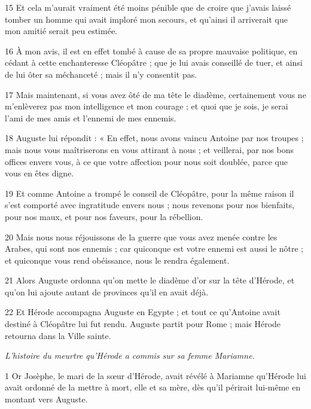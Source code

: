 \par 15 Et cela m'aurait vraiment été moins pénible que de croire que j'avais laissé tomber un homme qui avait imploré mon secours, et qu'ainsi il arriverait que mon amitié serait peu estimée.

\par 16 À mon avis, il est en effet tombé à cause de sa propre mauvaise politique, en cédant à cette enchanteresse Cléopâtre ; que je lui avais conseillé de tuer, et ainsi de lui ôter sa méchanceté ; mais il n'y consentit pas.

\par 17 Mais maintenant, si vous avez ôté de ma tête le diadème, certainement vous ne m'enlèverez pas mon intelligence et mon courage ; et quoi que je sois, je serai l’ami de mes amis et l’ennemi de mes ennemis.

\par 18 Auguste lui répondit : « En effet, nous avons vaincu Antoine par nos troupes ; mais nous vous maîtriserons en vous attirant à nous ; et veillerai, par nos bons offices envers vous, à ce que votre affection pour nous soit doublée, parce que vous en êtes digne.

\par 19 Et comme Antoine a trompé le conseil de Cléopâtre, pour la même raison il s'est comporté avec ingratitude envers nous ; nous revenons pour nos bienfaits, pour nos maux, et pour nos faveurs, pour la rébellion.

\par 20 Mais nous nous réjouissons de la guerre que vous avez menée contre les Arabes, qui sont nos ennemis ; car quiconque est votre ennemi est aussi le nôtre ; et quiconque vous rend obéissance, nous le rendra également.

\par 21 Alors Auguste ordonna qu'on mette le diadème d'or sur la tête d'Hérode, et qu'on lui ajoute autant de provinces qu'il en avait déjà.

\par 22 Et Hérode accompagna Auguste en Egypte ; et tout ce qu'Antoine avait destiné à Cléopâtre lui fut rendu. Auguste partit pour Rome ; mais Hérode retourna dans la Ville sainte.


\par \textit{L'histoire du meurtre qu'Hérode a commis sur sa femme Mariamne.}

\par 1 Or Josèphe, le mari de la sœur d'Hérode, avait révélé à Mariamne qu'Hérode lui avait ordonné de la mettre à mort, elle et sa mère, dès qu'il périrait lui-même en montant vers Auguste.

